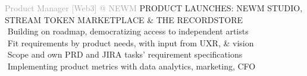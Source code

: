 
    
\begin{cvtable}

    {\textcolor{darkgray}{
    Product 
    Manager
    [Web3]
    \newline
    @ NEWM %
    }}%
    {
    }%
    {%
    {\scriptsize PRODUCT LAUNCHES: NEWM STUDIO, STREAM TOKEN MARKETPLACE \& THE RECORDSTORE} \\
     \textperiodcentered $ $ Building on roadmap, democratizing access to independent artists \\
     \textperiodcentered $ $ Fit requirements by product needs, with input from UXR, \& vision \\
     \textperiodcentered $ $ Scope and own PRD and JIRA tasks' requirement specifications \\
     \textperiodcentered $ $ Implementing product metrics with data analytics, marketing, CFO \\
}


\end{cvtable}
